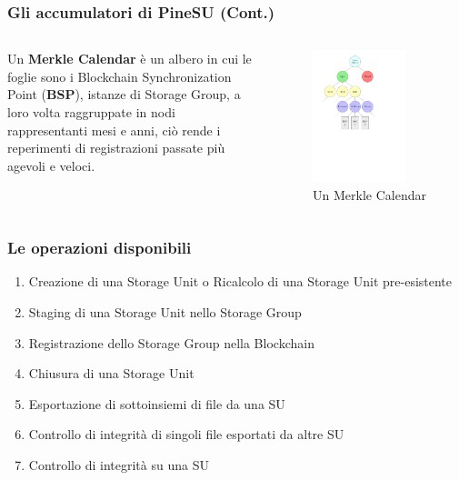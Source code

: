 \documentclass{beamer}
\begin{document}
\begin{frame}
	\frametitle{Gli accumulatori di PineSU (Cont.)}
	\begin{columns}
		Un \textbf{Merkle Calendar} è un albero in cui le foglie sono
		i Blockchain Synchronization Point (\textbf{BSP}), istanze di
		Storage Group, a loro volta raggruppate in nodi rappresentanti
		mesi e anni, ciò rende i reperimenti di registrazioni passate
		più agevoli e veloci.
		\centering
		\begin{figure}
			\includegraphics[width=0.8\textwidth]{figures/mc1.pdf}
			\caption{Un Merkle Calendar}
		\end{figure} 
	\end{columns}
\end{frame}

\begin{frame}
	\frametitle{Le operazioni disponibili}
	\begin{enumerate}
		\item Creazione di una Storage Unit o Ricalcolo di una Storage Unit pre-esistente
		\item Staging di una Storage Unit nello Storage Group
		\item Registrazione dello Storage Group nella Blockchain
		\item Chiusura di una Storage Unit
		\item Esportazione di sottoinsiemi di file da una SU
		\item Controllo di integrità di singoli file esportati da altre SU
		\item Controllo di integrità su una SU
	\end{enumerate}
\end{frame}
\end{document}
